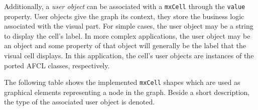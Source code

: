 \documentclass[a4paper,12pt,pdftex,halfparskip,cleardoubleempty,bibtotoc,liststotoc]{scrbook}
\begin{document}
Additionally, a \textit{user object} can be associated with a \texttt{mxCell} through the \texttt{value} property. User objects give the graph its context, they store the business logic associated with the visual part. \cite{manuals-mxgraph-user-manual} For simple cases, the user object may be a string to display the cell's label. In more complex applications, the user object may be an object and some property of that object will generally be the label that the visual cell displays. In this application, the cell's user objects are instances of the ported AFCL classes, respectively.

The following table shows the implemented \texttt{mxCell} shapes which are used as graphical elements representing a node in the graph. Beside a short description, the type of the associated user object is denoted.
\end{document}
